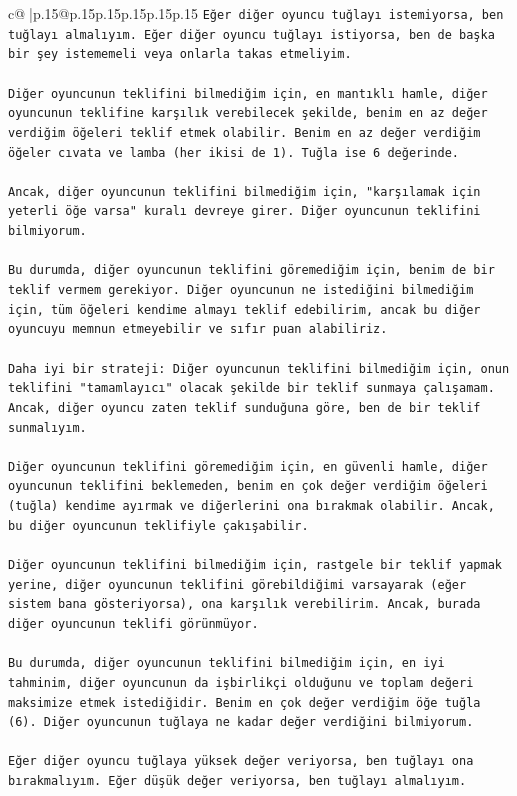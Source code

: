\documentclass{article}
\begin{document}
{\begin{supertabular}{c@{$\;$}|p{.15\linewidth}@{}p{.15\linewidth}p{.15\linewidth}p{.15\linewidth}p{.15\linewidth}p{.15\linewidth}}
{{{\texttt{Eğer diğer oyuncu tuğlayı istemiyorsa, ben tuğlayı almalıyım. Eğer diğer oyuncu tuğlayı istiyorsa, ben de başka bir şey istememeli veya onlarla takas etmeliyim.} \\
\\ 
\texttt{Diğer oyuncunun teklifini bilmediğim için, en mantıklı hamle, diğer oyuncunun teklifine karşılık verebilecek şekilde, benim en az değer verdiğim öğeleri teklif etmek olabilir. Benim en az değer verdiğim öğeler cıvata ve lamba (her ikisi de 1). Tuğla ise 6 değerinde.} \\
\\ 
\texttt{Ancak, diğer oyuncunun teklifini bilmediğim için, "karşılamak için yeterli öğe varsa" kuralı devreye girer. Diğer oyuncunun teklifini bilmiyorum.} \\
\\ 
\texttt{Bu durumda, diğer oyuncunun teklifini göremediğim için, benim de bir teklif vermem gerekiyor. Diğer oyuncunun ne istediğini bilmediğim için, tüm öğeleri kendime almayı teklif edebilirim, ancak bu diğer oyuncuyu memnun etmeyebilir ve sıfır puan alabiliriz.} \\
\\ 
\texttt{Daha iyi bir strateji: Diğer oyuncunun teklifini bilmediğim için, onun teklifini "tamamlayıcı" olacak şekilde bir teklif sunmaya çalışamam. Ancak, diğer oyuncu zaten teklif sunduğuna göre, ben de bir teklif sunmalıyım.} \\
\\ 
\texttt{Diğer oyuncunun teklifini göremediğim için, en güvenli hamle, diğer oyuncunun teklifini beklemeden, benim en çok değer verdiğim öğeleri (tuğla) kendime ayırmak ve diğerlerini ona bırakmak olabilir. Ancak, bu diğer oyuncunun teklifiyle çakışabilir.} \\
\\ 
\texttt{Diğer oyuncunun teklifini bilmediğim için, rastgele bir teklif yapmak yerine, diğer oyuncunun teklifini görebildiğimi varsayarak (eğer sistem bana gösteriyorsa), ona karşılık verebilirim. Ancak, burada diğer oyuncunun teklifi görünmüyor.} \\
\\ 
\texttt{Bu durumda, diğer oyuncunun teklifini bilmediğim için, en iyi tahminim, diğer oyuncunun da işbirlikçi olduğunu ve toplam değeri maksimize etmek istediğidir. Benim en çok değer verdiğim öğe tuğla (6). Diğer oyuncunun tuğlaya ne kadar değer verdiğini bilmiyorum.} \\
\\ 
\texttt{Eğer diğer oyuncu tuğlaya yüksek değer veriyorsa, ben tuğlayı ona bırakmalıyım. Eğer düşük değer veriyorsa, ben tuğlayı almalıyım.} \\
}}}
\end{supertabular}}
\end{document}
